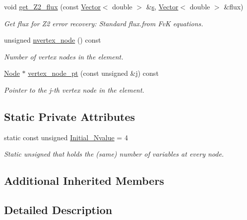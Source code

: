 \begin{DoxyCompactItemize}
void \hyperlink{classoomph_1_1TDisplacementBasedFoepplvonKarmanElement_a921610ebc718302d9e9fbb84e6f142f3}{get\+\_\+\+Z2\+\_\+flux} (const \hyperlink{classoomph_1_1Vector}{Vector}$<$ double $>$ \&\hyperlink{cfortran_8h_ab7123126e4885ef647dd9c6e3807a21c}{s}, \hyperlink{classoomph_1_1Vector}{Vector}$<$ double $>$ \&flux)
\begin{DoxyCompactList}\small\item\em Get \textquotesingle{}flux\textquotesingle{} for Z2 error recovery\+: Standard flux.\+from FvK equations. \end{DoxyCompactList}\item 
unsigned \hyperlink{classoomph_1_1TDisplacementBasedFoepplvonKarmanElement_a8d0654116b55993bf68b640f74d4e4a4}{nvertex\+\_\+node} () const
\begin{DoxyCompactList}\small\item\em Number of vertex nodes in the element. \end{DoxyCompactList}\item 
\hyperlink{classoomph_1_1Node}{Node} $\ast$ \hyperlink{classoomph_1_1TDisplacementBasedFoepplvonKarmanElement_abc04483e26179e84bc8bc0034a533a74}{vertex\+\_\+node\+\_\+pt} (const unsigned \&j) const
\begin{DoxyCompactList}\small\item\em Pointer to the j-\/th vertex node in the element. \end{DoxyCompactList}\end{DoxyCompactItemize}
\subsection*{Static Private Attributes}
\begin{DoxyCompactItemize}
\item 
static const unsigned \hyperlink{classoomph_1_1TDisplacementBasedFoepplvonKarmanElement_a2bec0ef510b12d4e1ad23e3e8d966306}{Initial\+\_\+\+Nvalue} = 4
\begin{DoxyCompactList}\small\item\em Static unsigned that holds the (same) number of variables at every node. \end{DoxyCompactList}\end{DoxyCompactItemize}
\subsection*{Additional Inherited Members}


\subsection{Detailed Description}
